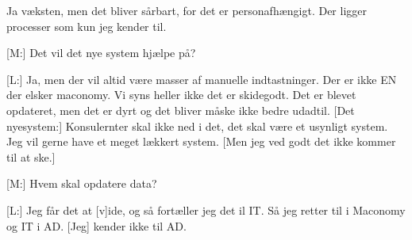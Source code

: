\begin{linenumbers*}
 Ja væksten, men det bliver sårbart, for det er personafhængigt. Der ligger processer som kun jeg kender til.

[M:] Det vil det nye system hjælpe på?

[L:] Ja, men der vil altid være masser af manuelle indtastninger. Der er ikke EN der elsker maconomy. Vi syns heller ikke det er skidegodt. Det er blevet opdateret, men det er dyrt og det bliver måske ikke bedre udadtil.
[Det nyesystem:]
Konsulernter skal ikke ned i det, det skal være et usynligt system. Jeg vil gerne have et meget lækkert system. [Men jeg ved godt det ikke kommer til at ske.]

[M:] Hvem skal opdatere data?

[L:] Jeg får det at [v]ide, og så fortæller jeg det il IT. Så jeg retter til i Maconomy og IT i AD. [Jeg] kender ikke til AD.
\end{linenumbers*}